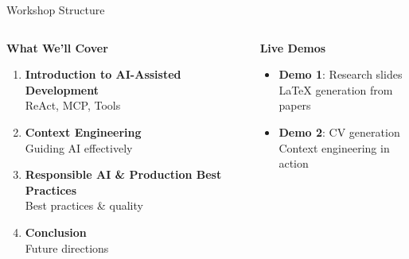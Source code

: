 \documentclass[aspectratio=169]{beamer}
\begin{document}
\begin{frame}{Workshop Structure}
  \begin{columns}[T]
    \begin{column}{0.48\textwidth}
      \centering
      \large\bfseries
      \textcolor{conesaTeal}{What We'll Cover}

      \vspace{0.5cm}
      \normalsize

      \begin{enumerate}
        \item \textbf{Introduction to AI-Assisted Development}\\
        \small ReAct, MCP, Tools
        
        \vspace{0.3cm}
        
        \item \textbf{Context Engineering}\\
        \small Guiding AI effectively
        
        \vspace{0.3cm}
        
        \item \textbf{Responsible AI \& Production Best Practices}\\
        \small Best practices \& quality
        
        \vspace{0.3cm}
        
        \item \textbf{Conclusion}\\
        \small Future directions
      \end{enumerate}
    \end{column}
    \begin{column}{0.48\textwidth}
      \centering
      \large\bfseries
      \textcolor{conesaOrange}{Live Demos}

      \vspace{0.5cm}
      \normalsize

      \begin{itemize}
        \item \textbf{Demo 1}: Research slides\\
        \small LaTeX generation from papers
        
        \vspace{0.3cm}
        
        \item \textbf{Demo 2}: CV generation\\
        \small Context engineering in action
        

\end{itemize}
\end{column}
\end{columns}
\end{frame}
\end{document}
